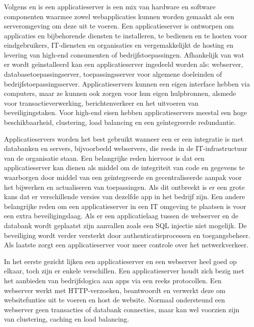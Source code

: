 \subsubsection{}
\label{subsubsec:Applicatieserver}
Volgens \textcite{TechTerms2019} en \textcite{ProTeam2018} is een applicatieserver is een mix van hardware en software componenten waarmee zowel webapplicaties kunnen worden gemaakt als een serveromgeving om deze uit te voeren. Een applicatieserver is ontworpen om applicaties en bijbehorende diensten te installeren, te bedienen en te hosten voor eindgebruikers, IT-diensten en organisaties en vergemakkelijkt de hosting en levering van high-end consumenten of bedrijfstoepassingen. Afhankelijk van wat er wordt geïnstalleerd kan een applicatieserver ingedeeld worden als: webserver, databasetoepassingserver, toepassingsserver voor algemene doeleinden of bedrijfstoepassingsserver. Applicatieservers kunnen een eigen interface hebben via computers, maar ze kunnen ook zorgen voor hun eigen hulpbronnen, alsmede voor transactieverwerking, berichtenverkeer en het uitvoeren van beveiligingstaken. Voor high-end eisen hebben applicatieservers meestal een hoge beschikbaarheid, clustering, load balancing en een geïntegreerde redundantie. 

Applicatieservers worden het best gebruikt wanneer een er een integratie is met databanken en servers, bijvoorbeeld webservers, die reeds in de IT-infrastructuur van de organisatie staan. Een belangrijke reden hiervoor is dat een applicatieserver kan dienen als middel om de integriteit van code en gegevens te waarborgen door middel van een geïntegreerde en gecentraliseerde aanpak voor het bijwerken en actualiseren van toepassingen. Als dit ontbreekt is er een grote kans dat er verschillende versies van dezelfde app in het bedrijf zijn. Een andere belangrijke reden om een applicatieserver in een IT omgeving te plaatsen is voor een extra beveiligingslaag. Als er een applicatielaag tussen de webserver en de databank wordt geplaatst zijn aanvallen zoals een SQL injectie niet mogelijk. De beveiliging wordt verder versterkt door authenticatieprocessen en toegangsbeheer. Als laatste zorgt een applicatieserver voor meer controle over het netwerkverkeer\textcite{ProTeam2018}. 

In het eerste gezicht lijken een applicatieserver en een webserver heel goed op elkaar, toch zijn er enkele verschillen. Een applicatieserver houdt zich bezig met het aanbieden van bedrijfslogica aan apps via een reeks protocollen. Een webserver werkt met HTTP-verzoeken, beantwoordt en verwerkt deze om websitefunties uit te voeren en host de website. Normaal ondersteund een webserver geen transacties of databank connecties, maar kan wel voorzien zijn van clustering, caching en load balancing\textcite{ProTeam2018}.

